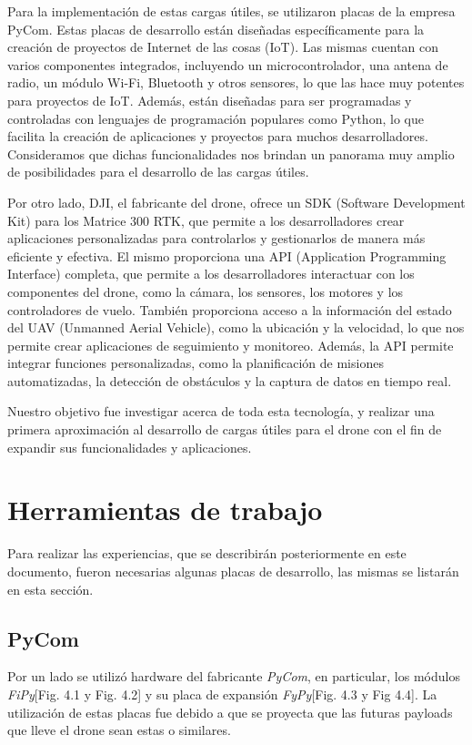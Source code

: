 \documentclass[12pt]{article}
\begin{document}
Para la implementación de estas cargas útiles, se utilizaron placas de la empresa PyCom. Estas placas de desarrollo están diseñadas específicamente para la creación de proyectos de Internet de las cosas (IoT). Las mismas cuentan con varios componentes integrados, incluyendo un microcontrolador, una antena de radio, un módulo Wi-Fi, Bluetooth y otros sensores, lo que las hace muy potentes para proyectos de IoT. Además, están diseñadas para ser programadas y controladas con lenguajes de programación populares como Python, lo que facilita la creación de aplicaciones y proyectos para muchos desarrolladores. Consideramos que dichas funcionalidades nos brindan un panorama muy amplio de posibilidades para el desarrollo de las cargas útiles.

Por otro lado, DJI, el fabricante del drone, ofrece un SDK (Software Development Kit) para los Matrice 300 RTK, que permite a los desarrolladores crear aplicaciones personalizadas para controlarlos y gestionarlos de manera más eficiente y efectiva. El mismo proporciona una API (Application Programming Interface) completa, que permite a los desarrolladores interactuar con los componentes del drone, como la cámara, los sensores, los motores y los controladores de vuelo. También proporciona acceso a la información del estado del UAV (Unmanned Aerial Vehicle), como la ubicación y la velocidad, lo que nos permite crear aplicaciones de seguimiento y monitoreo. Además, la API permite integrar funciones personalizadas, como la planificación de misiones automatizadas, la detección de obstáculos y la captura de datos en tiempo real.

Nuestro objetivo fue investigar acerca de toda esta tecnología, y realizar una primera aproximación al desarrollo de cargas útiles para el drone con el fin de expandir sus funcionalidades y aplicaciones.

\newpage
\section{Herramientas de trabajo}
\justifying
Para realizar las experiencias, que se describirán posteriormente en este documento, fueron necesarias algunas placas de desarrollo, las mismas se listarán en esta sección.
\subsection{PyCom}
Por un lado se utilizó hardware del fabricante \textit{PyCom}, en particular, los módulos \textit{FiPy}[Fig. 4.1 y Fig. 4.2] y su placa de expansión \textit{FyPy}[Fig. 4.3 y Fig 4.4]. La utilización de estas placas fue debido a que se proyecta que las futuras payloads que lleve el drone sean estas o similares.
\end{document}
